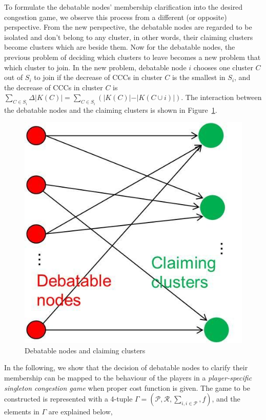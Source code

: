 \documentclass[10pt,journal,compsoc]{IEEEtran}
\theoremstyle{mytheoremstyle}
\theoremstyle{mytheoremstyle}
\theoremstyle{mytheoremstyle}
\begin{document}
To formulate the debatable nodes' membership clarification into the desired congestion game, we observe this process from a different (or opposite) perspective. 
From the new perspective, the debatable nodes are regarded to be isolated and don't belong to any cluster, in other words, their claiming clusters become clusters which are beside them. 
Now for the debatable nodes, the previous problem of deciding which clusters to leave becomes a new problem that which cluster to join.
In the new problem, debatable node $i$ chooses one cluster $C$ out of $S_i$ to join if the decrease of CCCs in cluster $C$ is the smallest in $S_i$, and the decrease of CCCs in cluster $C$ is $\sum_{C\in S_i}\Delta\vert K(C) \vert=\sum_{C\in S_i}({\vert K(C) \vert-\vert K(C\cup i) \vert})$.
The interaction between the debatable nodes and the claiming clusters is shown in Figure~\ref{debatable_nodes_claiming_cluster}.
\begin{figure}[ht!]
  \centering
  \includegraphics[width=0.25\linewidth]{singletongame_png.png}
  \caption{Debatable nodes and claiming clusters}
  \label{debatable_nodes_claiming_cluster}
\end{figure}




In the following, we show that the decision of debatable nodes to clarify their membership can be mapped to the behaviour of the players in a \textit{player-specific singleton congestion game} when proper cost function is given.
The game to be constructed is represented with a 4-tuple $\Gamma=(\mathcal{P},\mathcal{R},\sum_{i, i \in \mathcal{P}}, f)$, and the elements in $\Gamma$ are explained below,
\end{document}
